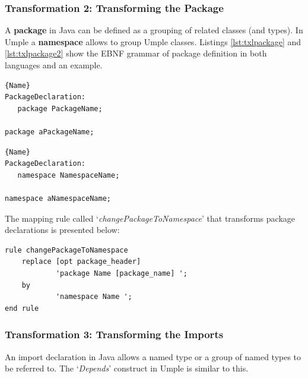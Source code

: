 \subsubsection{Transformation 2: Transforming the Package} 

A \textbf{package} in Java can be defined as a grouping of related classes (and types). In Umple a \textbf{namespace} allows to group Umple classes. Listings \ref{lst:txlpackage} and \ref{lst:txlpackage2} show the EBNF grammar of package definition in both languages and an example. 

\noindent\begin{minipage}{.45\textwidth}
\begin{lstlisting}[style=umplePlain,caption=Java package,label=lst:txlpackage]{Name}
PackageDeclaration:
   package PackageName; 

package aPackageName;
\end{lstlisting}
\end{minipage}\hfill
\begin{minipage}{.45\textwidth}
\begin{lstlisting}[style=umplePlain,caption=Umple namespace,label=lst:txlpackage2]{Name}
PackageDeclaration:
   namespace NamespaceName;
 
namespace aNamespaceName;
\end{lstlisting}
\end{minipage}


The mapping rule called `\textit{changePackageToNamespace}' that transforms package declarations is presented below:

\begin{lstlisting}[style=umplePlain, label=lst:packageDeclRule3, caption=TXL mapping rule for the transformation of the package declaration]
rule changePackageToNamespace 
    replace [opt package_header]      
            'package Name [package_name] '; 
    by       
            'namespace Name '; 
end rule	
\end{lstlisting}

\subsubsection{Transformation 3: Transforming the Imports} 

An import declaration in Java allows a named type or a group of named types to be referred to. The `\textit{Depends}' construct in Umple is similar to this. 

